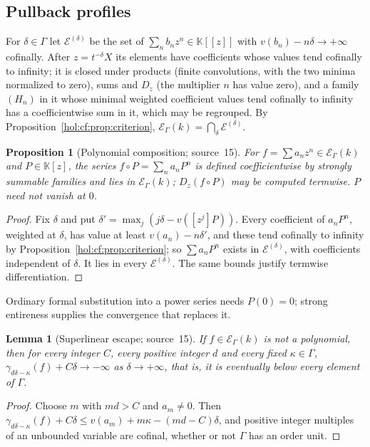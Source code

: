 \documentclass[11pt]{article}
\numberwithin{equation}{section}
\newtheorem{lemma}[theorem]{Lemma}
\newtheorem{proposition}[theorem]{Proposition}
\theoremstyle{definition}
\theoremstyle{remark}
\newcommand{\KK}{\mathbb K}
\newcommand{\EK}{\mathcal E_\Gamma(k)}
\begin{document}
\subsection{Pullback profiles}\label{hol:pc:sub:profiles}

For $\delta\in\Gamma$ let $\mathcal E^{(\delta)}$ be the set of
$\sum_nb_nz^n\in\KK[[z]]$ with $v(b_n)-n\delta\to+\infty$ cofinally. After
$z=t^{-\delta}X$ its elements have coefficients whose values tend cofinally to
infinity; it is closed under products (finite convolutions, with the two
minima normalized to zero), sums and $D_z$ (the multiplier $n$ has value zero),
and a family $(H_n)$ in it whose minimal weighted coefficient values tend
cofinally to infinity has a coefficientwise sum in it, which may be regrouped.
By Proposition~\ref{hol:cf:prop:criterion}, $\EK=\bigcap_\delta\mathcal
E^{(\delta)}$.

\begin{proposition}[Polynomial composition; source~15]
\label{hol:pc:prop:composition}
For $f=\sum a_nz^n\in\EK$ and $P\in\KK[z]$, the series $f\circ P=\sum_na_nP^n$
is defined coefficientwise by strongly summable families and lies in $\EK$;
$D_z(f\circ P)$ may be computed termwise. $P$ need not vanish at $0$.
\end{proposition}

\begin{proof}
Fix $\delta$ and put $\delta'=\max_j(j\delta-v([z^j]P))$. Every coefficient of
$a_nP^n$, weighted at $\delta$, has value at least $v(a_n)-n\delta'$, and these
tend cofinally to infinity by Proposition~\ref{hol:cf:prop:criterion}; so
$\sum a_nP^n$ exists in $\mathcal E^{(\delta)}$, with coefficients independent of
$\delta$. It lies in every $\mathcal E^{(\delta)}$. The same bounds justify
termwise differentiation.
\end{proof}

Ordinary formal substitution into a power series needs $P(0)=0$; strong
entireness supplies the convergence that replaces it.

\begin{lemma}[Superlinear escape; source~15]\label{hol:pc:lem:superlinear}
If $f\in\EK$ is not a polynomial, then for every integer $C$, every positive
integer $d$ and every fixed $\kappa\in\Gamma$,
$\gamma_{d\delta-\kappa}(f)+C\delta\to-\infty$ as $\delta\to+\infty$, that is,
it is eventually below every element of $\Gamma$.
\end{lemma}

\begin{proof}
Choose $m$ with $md>C$ and $a_m\ne0$. Then
$\gamma_{d\delta-\kappa}(f)+C\delta\le v(a_m)+m\kappa-(md-C)\delta$, and positive
integer multiples of an unbounded variable are cofinal, whether or not $\Gamma$
has an order unit.
\end{proof}
\end{document}
